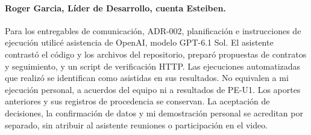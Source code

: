 \paragraph{Roger Garcia, Líder de Desarrollo, cuenta Esteiben.}
Para los entregables de comunicación, ADR-002, planificación e instrucciones
de ejecución utilicé asistencia de OpenAI, modelo GPT-6.1 Sol. El asistente
contrastó el código y los archivos del repositorio, preparó propuestas de
contratos y seguimiento, y un script de verificación HTTP. Las ejecuciones
automatizadas que realizó se identifican como asistidas en sus resultados.
No equivalen a mi ejecución personal, a acuerdos del equipo ni a resultados de
PE-U1. Los aportes anteriores y sus registros de procedencia se conservan.
La aceptación de decisiones, la confirmación de datos y mi demostración personal
se acreditan por separado, sin atribuir al asistente reuniones o participación
en el video.
